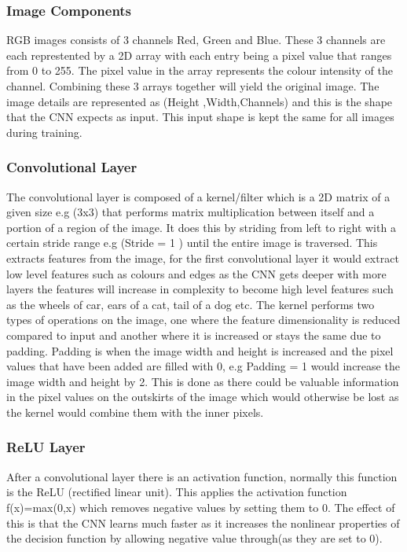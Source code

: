 \documentclass{csfyp}
\begin{document}
\subsubsection{Image Components}
RGB images consists of 3 channels Red, Green and Blue. These 3 channels are each represtented by a 2D array with each entry being a pixel value that ranges from 0 to 255. The pixel value in the array represents the colour intensity of the channel. Combining these 3 arrays together will yield the original image. The image details are represented as (Height ,Width,Channels) and this is the shape that the CNN expects as input. This input shape is kept the same for all images during training.


\subsubsection{Convolutional Layer}
The convolutional layer is composed of a kernel/filter which is a 2D matrix of a given size e.g (3x3) that performs matrix multiplication between itself and a portion of a region of the image. It does this by striding from left to right with a certain stride range e.g (Stride = 1 ) until the entire image is traversed. This extracts features from the image, for the first convolutional layer it would extract low level features such as colours and edges as the CNN gets deeper with more layers the features will increase in complexity to become high level features such as the wheels of car, ears of a cat, tail of a dog etc. The kernel performs two types of operations on the image, one where the feature dimensionality is reduced compared to input and another where it is increased or stays the same due to padding. Padding is when the image width and height is increased and the pixel values that have been added are filled with 0, e.g Padding = 1 would increase the image width and height by 2. This is done as there could be valuable information in the pixel values on the outskirts of the image which would otherwise be lost as the kernel would combine them with the inner pixels.

\subsubsection{ReLU Layer}
After a convolutional layer there is an activation function, normally this function is the ReLU (rectified linear unit). This applies the activation function f(x)=max(0,x) which removes negative values by setting them to 0. The effect of this is that the CNN learns much faster as it increases the nonlinear properties of the decision function by allowing negative value through(as they are set to 0).
\end{document}
